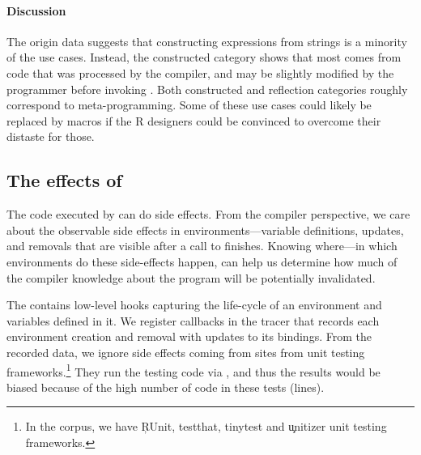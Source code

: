 \documentclass[review,screen,acmsmall,anonymous=true]{acmart}
\begin{document}
\paragraph{Discussion}

The origin data suggests that constructing expressions from strings is a
minority of the use cases. Instead, the constructed category shows that most \evals comes from code that was processed by the compiler, and may be
slightly modified by the programmer before invoking \eval. Both constructed and
reflection categories roughly correspond to meta-programming. Some of these use
cases could likely be replaced by macros if the R designers could be convinced
to overcome their distaste for those.

\subsection{The effects of \eval}

The code executed by \eval can do side effects. From the compiler perspective,
we care about the observable side effects in environments---\ie variable
definitions, updates, and removals that are visible after a call to \eval
finishes. Knowing where---\ie in which environments do these side-effects
happen, can help us determine how much of the compiler knowledge about the
program will be potentially invalidated.

The \rdyntrace contains low-level hooks capturing the life-cycle of an
environment and variables defined in it. We register callbacks in the tracer
that records each environment creation and removal with updates to its
bindings. From the recorded data, we ignore side effects coming from \eval
sites from unit testing frameworks.\footnote{In the corpus, we have \c{RUnit,
testthat, tinytest} and \c{unitizer} unit testing frameworks.} They run the
testing code via \eval, and thus the results would be biased because of the
high number of code in these tests (\CranRunnableCodeTestsRnd lines).
\end{document}
